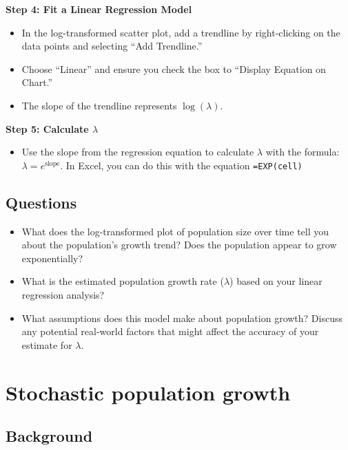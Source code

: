 \documentclass[
  a4paper]{book}
\providecommand{\tightlist}{%
  \setlength{\itemsep}{0pt}\setlength{\parskip}{0pt}}
\begin{document}
\textbf{Step 4: Fit a Linear Regression Model}

\begin{itemize}
\tightlist
\item
  In the log-transformed scatter plot, add a trendline by right-clicking on the data points and selecting ``Add Trendline.''
\item
  Choose ``Linear'' and ensure you check the box to ``Display Equation on Chart.''
\item
  The slope of the trendline represents \(\log(\lambda)\).
\end{itemize}

\textbf{Step 5: Calculate \(\lambda\)}

\begin{itemize}
\tightlist
\item
  Use the slope from the regression equation to calculate \(\lambda\) with the formula: \(\lambda = e^{\text{slope}}\). In Excel, you can do this with the equation \texttt{=EXP(cell)}
\end{itemize}

\section{Questions}\label{questions-3}

\begin{itemize}
\tightlist
\item
  What does the log-transformed plot of population size over time tell you about the population's growth trend? Does the population appear to grow exponentially?
\item
  What is the estimated population growth rate (\(\lambda\)) based on your linear regression analysis?
\item
  What assumptions does this model make about population growth? Discuss any potential real-world factors that might affect the accuracy of your estimate for \(\lambda\).
\end{itemize}

\chapter{Stochastic population growth}\label{stochastic-population-growth}

\section{Background}\label{background-4}
\end{document}
